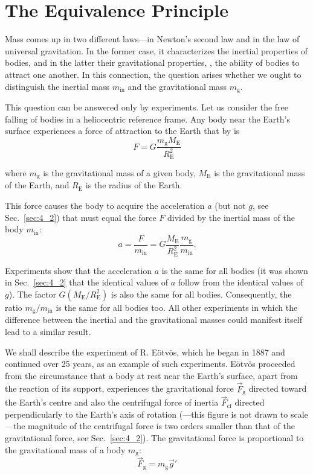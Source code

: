 \section{The Equivalence Principle}\label{sec:6_3}

Mass comes up in two different laws---in Newton's second law and in the law of universal gravitation. In the former case, it characterizes the inertial properties of bodies, and in the latter their gravitational properties, \ie, the ability of bodies to attract one another. In this connection, the question arises whether we ought to distinguish the inertial mass $m_{\text{in}}$ and the gravitational mass $m_{\text{g}}$.

This question can be answered only by experiments. Let us consider the free falling of bodies in a heliocentric reference frame. Any body near the Earth's surface experiences a force of attraction to the Earth that by  is
\begin{equation*}
	F = G\frac{m_{\text{g}} M_{\text{E}}}{R_{\text{E}}^2}
\end{equation*}

\noindent
where $m_{\text{g}}$ is the gravitational mass of a given body, $M_{\text{E}}$ is the gravitational mass of the Earth, and $R_{\text{E}}$ is the radius of the Earth.

This force causes the body to acquire the acceleration $a$ (but not $g$, see Sec.~\ref{sec:4_2}) that must equal the force $F$ divided by the inertial mass of the body $m_{\text{in}}$:
\begin{equation}\label{eq:6_20}
	a = \frac{F}{m_{\text{in}}} = G\frac{M_{\text{E}}}{R_{\text{E}}^2}\frac{m_{\text{g}}}{m_{\text{in}}}.
\end{equation}

Experiments show that the acceleration $a$ is the same for all bodies (it was shown in Sec.~\ref{sec:4_2} that the identical values of $a$ follow from the identical values of $g$). The factor $G(M_{\text{E}}/R_{\text{E}}^2)$ is also the same for all bodies. Consequently, the ratio $m_{\text{g}}/m_{\text{in}}$ is the same for all bodies too. All other experiments in which the difference between the inertial and the gravitational masses could manifest itself lead to a similar result.

We shall describe the experiment of R. E\"{o}tv\"{o}s, which he began in 1887 and continued over 25 years, as an example of such experiments. E\"{o}tv\"{o}s proceeded from the circumstance that a body at rest near the Earth's surface, apart from the reaction of its support, experiences the gravitational force $\vec{F}_{\text{g}}$ directed toward the Earth's centre and also the centrifugal force of inertia $\vec{F}_{\text{cf}}$ directed perpendicularly to the Earth's axis of rotation (---this figure is not drawn to scale---the magnitude of the centrifugal force is two orders smaller than that of the gravitational force, see Sec.~\ref{sec:4_2}). The gravitational force is proportional to the gravitational mass of a body $m_{\text{g}}$:
\begin{equation*}
	\vec{F}_{\text{g}} = m_{\text{g}}\vec{g}'
\end{equation*}

